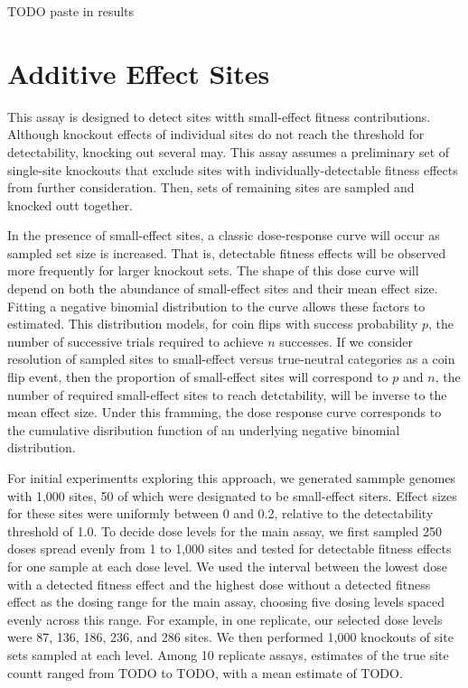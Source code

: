 TODO paste in results

\section{Additive Effect Sites}

This assay is designed to detect sites witth small-effect fitness contributions.
Although knockout effects of individual sites do not reach the threshold for detectability, knocking out several may.
This assay assumes a preliminary set of single-site knockouts that exclude sites with individually-detectable fitness effects from further consideration.
Then, sets of remaining sites are sampled and knocked outt together.

In the presence of small-effect sites, a classic dose-response curve will occur as sampled set size is increased.
That is, detectable fitness effects will be observed more frequently for larger knockout sets.
The shape of this dose curve will depend on both the abundance of small-effect sites and their mean effect size.
Fitting a negative binomial distribution to the curve allows these factors to estimated.
This distribution models, for coin flips with success probability $p$, the number of successive trials required to achieve $n$ successes.
If we consider resolution of sampled sites to small-effect versus true-neutral categories as a coin flip event, then the proportion of small-effect sites will correspond to $p$ and $n$, the number of required small-effect sites to reach detctability, will be inverse to the mean effect size.
Under this framming, the dose response curve corresponds to the cumulative disribution function of an underlying negative binomial distribution.

For initial experimentts exploring this approach, we generated sammple genomes with 1,000 sites, 50 of which were designated to be small-effect siters.
Effect sizes for these sites were uniformly between 0 and 0.2, relative to the detectability threshold of 1.0.
To decide dose levels for the main assay, we first sampled 250 doses spread evenly from 1 to 1,000 sites and tested for detectable fitness effects for one sample at each dose level.
We used the interval between the lowest dose with a detected fitness effect and the highest dose without a detected fitness effect as the dosing range for the main assay, choosing five dosing levels spaced evenly across this range.
For example, in one replicate, our selected dose levels were 87, 136, 186, 236, and 286 sites.
We then performed 1,000 knockouts of site sets sampled at each level.
Among 10 replicate assays, estimates of the true site countt ranged from TODO to TODO, with a mean estimate of TODO.

